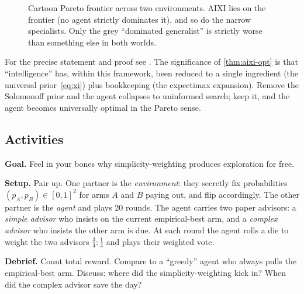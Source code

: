 \documentclass[12pt,a4paper]{article}
\theoremstyle{plain}
\theoremstyle{definition}
\begin{document}
\begin{figure}[h]
\centering
{}
\caption{Cartoon Pareto frontier across two environments.  AIXI lies
on the frontier (no agent strictly dominates it), and so do the narrow
specialists.  Only the grey ``dominated generalist'' is strictly
worse than something else in both worlds.}
\label{fig:pareto}
\end{figure}

For the precise statement and proof see
\citet[Ch.~5]{hutter2005universal}.  The significance of
\cref{thm:aixi-opt} is that ``intelligence'' has, within this
framework, been reduced to a single ingredient (the universal
prior~\eqref{eq:xi}) plus bookkeeping (the expectimax expansion).
Remove the Solomonoff prior and the agent collapses to uninformed
search; keep it, and the agent becomes universally optimal in the
Pareto sense.

\subsection*{Activities}

\begin{activity}[title={Activity A: Two-armed bandit, live in the room}]
\textbf{Goal.}  Feel in your bones why simplicity-weighting produces
exploration for free.

\textbf{Setup.}  Pair up.  One partner is the \emph{environment}: they
secretly fix probabilities $(p_A, p_B)\in[0,1]^2$ for arms $A$ and $B$
paying out, and flip accordingly.  The other partner is the
\emph{agent} and plays $20$ rounds.  The agent carries two paper
advisors: a \emph{simple advisor} who insists on the current
empirical-best arm, and a \emph{complex advisor} who insists the other
arm is due.  At each round the agent rolls a die to weight the two
advisors $\tfrac{3}{4} : \tfrac{1}{4}$ and plays their weighted vote.

\textbf{Debrief.}  Count total reward.  Compare to a ``greedy'' agent
who always pulls the empirical-best arm.  Discuss: where did the
simplicity-weighting kick in?  When did the complex advisor save the
day?
\end{activity}
\end{document}
